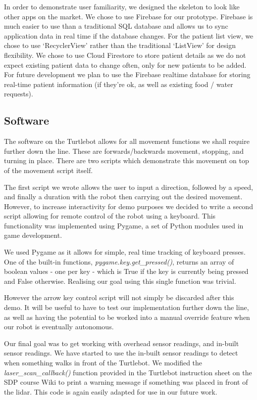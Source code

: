 \documentclass{article}
\begin{document}
In order to demonstrate user familiarity, we designed the skeleton to look like other apps on the market. We chose to use Firebase for our prototype. Firebase is much easier to use than a traditional SQL database and allows us to sync application data in real time if the database changes. For the patient list view, we chose to use `RecyclerView' rather than the traditional `ListView' for design flexibility. We chose to use Cloud Firestore to store patient details as we do not expect existing patient data to change often, only for new patients to be added. For future development we plan to use the Firebase realtime database for storing real-time patient information (if they're ok, as well as existing food / water requests).

\subsection{Software}

The software on the Turtlebot allows for all movement functions we shall require further down the line. These are forwards/backwards movement, stopping, and turning in place. There are two scripts which demonstrate this movement on top of the movement script itself.

The first script we wrote allows the user to input a direction, followed by a speed, and finally a duration with the robot then carrying out the desired movement. However, to increase interactivity for demo purposes we decided to write a second script allowing for remote control of the robot using a keyboard. This functionality was implemented using Pygame, a set of Python modules used in game development.

We used Pygame as it allows for simple, real time tracking of keyboard presses. One of the built-in functions, {\it pygame.key.get\_pressed()}, returns an array of boolean values - one per key - which is True if the key is currently being pressed and False otherwise. Realising our goal using this single function was trivial.

However the arrow key control script will not simply be discarded after this demo. It will be useful to have to test our implementation further down the line, as well as having the potential to be worked into a manual override feature when our robot is eventually autonomous.

Our final goal was to get working with overhead sensor readings, and in-built sensor readings. We have started to use the in-built sensor readings to detect when something walks in front of the Turtlebot. We modified the {\it laser\_scan\_callback()} function provided in the Turtlebot instruction sheet on the SDP course Wiki to print a warning message if something was placed in front of the lidar. This code is again easily adapted for use in our future work.
\end{document}

